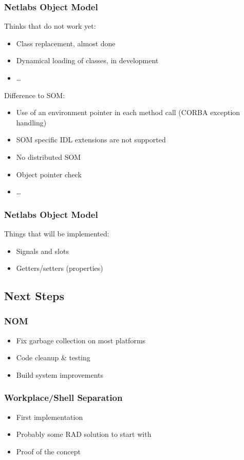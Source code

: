 \documentclass{beamer}
\begin{document}
\begin{frame}
\frametitle{Netlabs Object Model}
Thinks that do not work yet:
\begin{itemize}
  \item Class replacement, almost done
  \item Dynamical loading of classes, in development
  \item \ldots
\end{itemize}
Difference to SOM:
\begin{itemize}
  \item Use of an environment pointer in each method call (CORBA exception
  handling)
  \item SOM specific IDL extensions are not supported
  \item No distributed SOM
  \item Object pointer check
  \item \ldots
\end{itemize}
\end{frame}

\begin{frame}
\frametitle{Netlabs Object Model}
Things that will be implemented:
\begin{itemize}
  \item Signals and slots
  \item Getters/setters (properties)
\end{itemize}
\end{frame}

\subsection{Next Steps}
\begin{frame}
\frametitle{NOM}
\begin{itemize}
  \item Fix garbage collection on most platforms
  \item Code cleanup \& testing
  \item Build system improvements
\end{itemize}
\end{frame}

\begin{frame}
\frametitle{Workplace/Shell Separation}
\begin{itemize}
  \item First implementation
  \item Probably some RAD solution to start with
  \item Proof of the concept
\end{itemize}
\end{frame}
\end{document}
